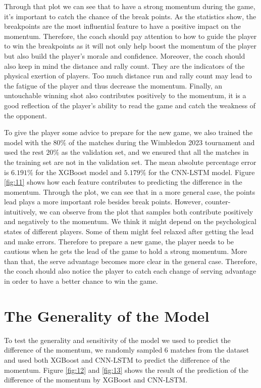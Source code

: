 \documentclass[12pt]{article}
\begin{document}
Through that plot we can see that to have a strong momentum during the game, it's important to catch the chance of the break points. As the statistics show, the breakpoints are the most 
influential feature to have a positive impact on the momentum. Therefore, the coach should pay attention to how to guide the player to win the breakpoints as it will not only help boost the 
momentum of the player but also build the player's morale and confidence. Moreover, the coach should also keep in mind the distance and rally count. They are the indicators of the
physical exertion of players. Too much distance run and rally count may lead to the fatigue of the player and thus decrease the momentum. Finally, an untouchable winning shot also contributes positively to the momentum, it is a good reflection of the player's ability to read the game and catch the weakness of the opponent.

To give the player some advice to prepare for the new game, we also trained the model with the $80\%$ of the matches during the Wimbledon 2023 tournament and used the rest $20\%$ as the validation set, and we 
ensured that all the matches in the training set are not in the validation set. The mean absolute percentage error is $6.191\%$ for the XGBoost model and $5.179\%$ for the CNN-LSTM model. Figure \ref{fig:11} 
shows how each feature contributes to predicting the difference in the momentum. Through the plot, we can see that in a more general case, the points lead plays a more important role besides break points. However, counter-intuitively, we can observe from the plot that samples both contribute positively and negatively to the momentum. We think it might depend on the psychological states of different players. Some of them might feel relaxed after getting the lead and make errors.
Therefore to prepare a new game,
the player needs to be cautious when he gets the lead of the game to hold a strong momentum. More than that, the serve advantage becomes more clear in the general case. Therefore, the coach should also notice the 
player to catch each change of serving advantage in order to have a better chance to win the game.

\section{The Generality of the Model}
\quad To test the generality and sensitivity of the model we used to predict the difference of the momentum, we randomly
sampled 6 matches from the dataset and used both XGBoost and CNN-LSTM to predict the difference of the momentum. Figure \ref{fig:12}
and \ref{fig:13} shows the result of the prediction of the difference of the momentum by XGBoost and CNN-LSTM.
\end{document}
